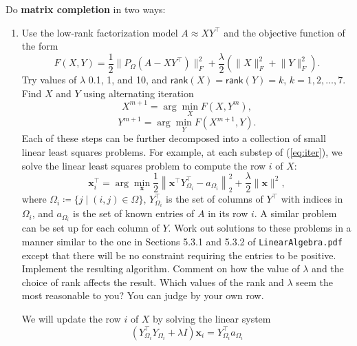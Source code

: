 \documentclass{../../../kin_math}
\begin{document}
\begin{questions}
  \question Do \textbf{matrix completion} in two ways:
  \begin{enumerate}
    \item Use the low-rank factorization model $A \approx XY^\top$ and the objective function of the form
    \begin{equation*}
      F(X, Y) = \frac{1}{2} \lVert P_\Omega(A - XY^\top) \rVert_F^2 + \frac{\lambda}{2} (\lVert X \rVert_F^2 + \lVert Y \rVert_F^2).
    \end{equation*}
    Try values of $\lambda$ 0.1, 1, and 10, and $\textsf{rank}(X) = \textsf{rank}(Y) = k$, $k = 1, 2, \dots, 7$. Find $X$ and $Y$ using alternating iteration
    \begin{equation}
      \label{eq:iter}
      X^{m + 1} = \arg \min_X F(X, Y^m),
    \end{equation}
    \begin{equation}
      Y^{m + 1} = \arg \min_Y F(X^{m + 1}, Y).
    \end{equation}
    Each of these steps can be further decomposed into a collection of small linear least squares problems. For example, at each substep of (\ref{eq:iter}), we solve the linear least squares problem to compute the row $i$ of $X$:
    \begin{equation}
      \textbf{x}_i^\top = \arg \min_\textbf{x} \frac{1}{2} \left\lVert \textbf{x}^\top Y_{\Omega_i}^\top - a_{\Omega_i} \right\rVert_2^2 + \frac{\lambda}{2} \lVert \textbf{x} \rVert^2,
    \end{equation}
    where $\Omega_i \coloneqq \{j \mid (i, j) \in \Omega\}$, $Y_{\Omega_i}^\top$ is the set of columns of $Y^\top$ with indices in $\Omega_i$, and $a_{\Omega_i}$ is the set of known entries of $A$ in its row $i$. A similar problem can be set up for each column of $Y$. Work out solutions to these problems in a manner similar to the one in Sections 5.3.1 and 5.3.2 of \texttt{LinearAlgebra.pdf} except that there will be no constraint requiring the entries to be positive. Implement the resulting algorithm. Comment on how the value of $\lambda$ and the choice of rank affects the result. Which values of the rank and $\lambda$ seem the most reasonable to you? You can judge by your own row.
    \begin{solution}
      We will update the row $i$ of $X$ by solving the linear system
      \begin{equation*}
        (Y_{\Omega_i}^\top Y_{\Omega_i} + \lambda I) \textbf{x}_i = Y_{\Omega_i}^\top a_{\Omega_i}

\end{equation*}
\end{solution}
\end{enumerate}
\end{questions}
\end{document}
